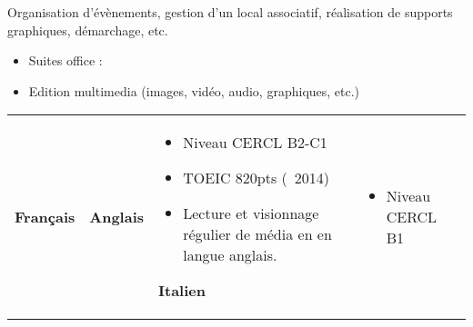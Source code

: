 \documentclass[10pt,a4paper,ragged2e,withhyper,normalphoto]{altacv}
\newcommand{\emphasis}[1]{\bfseries\textcolor{emphasis}{#1}}
\begin{document}
\begin{paracol}{2}
Organisation d'évènements, gestion d'un local associatif, réalisation de supports graphiques, démarchage, etc.







\begin{itemize}
	\item Suites office : 
	\item Edition multimedia (images, vidéo, audio, graphiques, etc.)
\end{itemize}


\begin{tabularx}{\linewidth}{X X}
	\emphasis{Français} & \skillfive{5}
	\hline
	\emphasis{Anglais} & \par%
	\begin{itemize}
			\item Niveau CERCL B2-C1
			\item TOEIC 820pts (\faCalendar~2014)
			\item Lecture et visionnage régulier de média en en langue anglais.
	\end{itemize}
	\hline
	\emphasis{Italien} & \par%
	\begin{itemize}
		\item Niveau CERCL B1
	\end{itemize}
\end{tabularx}



\end{paracol}
\end{document}
